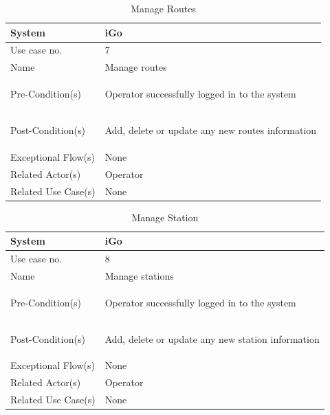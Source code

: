 \documentclass{article}
\begin{document}
\begin{table}[ht]
    \centering
    \begin{tabular}{|l|p{11cm}|}
         \hline
         System& iGo\\
         \hline
         Use case no. & 7 \\
         \hline
         Name & Manage routes \\
         \hline
         Pre-Condition(s)   & 
         \begin{enumerate*}[itemjoin=\newline]
             \item Operator successfully logged in to the system
         \end{enumerate*} \\
         \hline
         Post-Condition(s)  & 
         \begin{enumerate*}[itemjoin=\newline]
             \item Add, delete or update any new routes information
         \end{enumerate*} \\
         \hline
         Exceptional Flow(s)& None\\
         \hline
         Related Actor(s)   & Operator\\
         \hline
         Related Use Case(s)& None\\
         \hline
    \end{tabular}
    \caption{Manage Routes}
    \label{tab:UC_route}
\end{table}
\pagebreak
\begin{table}[ht]
    \centering
    \begin{tabular}{|l|p{11cm}|}
         \hline
         System& iGo\\
         \hline
         Use case no. & 8 \\
         \hline
         Name & Manage stations \\
         \hline
         Pre-Condition(s)   & 
         \begin{enumerate*}[itemjoin=\newline]
             \item Operator successfully logged in to the system
         \end{enumerate*} \\
         \hline
         Post-Condition(s)  & 
         \begin{enumerate*}[itemjoin=\newline]
             \item Add, delete or update any new station information
         \end{enumerate*} \\
         \hline
         Exceptional Flow(s)& None\\
         \hline
         Related Actor(s)   & Operator\\
         \hline
         Related Use Case(s)& None\\
         \hline
    \end{tabular}
    \caption{Manage Station}
    \label{tab:UC_station}
\end{table}
\end{document}
